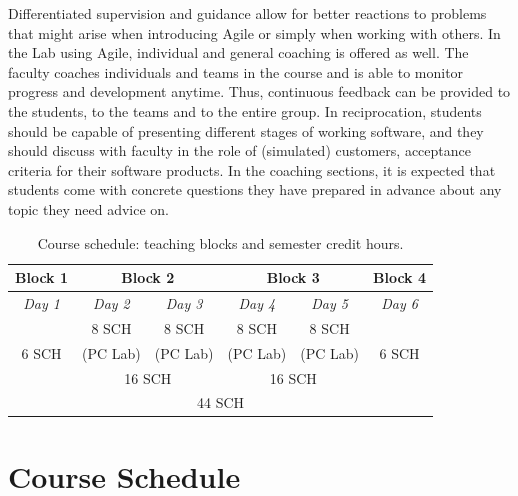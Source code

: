 \documentclass[conference]{IEEEtran}
\begin{document}
Differentiated supervision and guidance allow for better reactions to problems that might arise when introducing Agile or simply when working with others. In the Lab using Agile, individual and general coaching is offered as well. The faculty coaches individuals and teams in the course and is able to monitor progress and development anytime. Thus, continuous feedback can be provided to the students, to the teams and to the entire group. In reciprocation, students should be capable of presenting different stages of working software, and they should discuss with faculty in the role of (simulated) customers, acceptance criteria for their software products. In the coaching sections, it is expected that students come with concrete questions they have prepared in advance about any topic they need advice on.

\begin{table}[!t]
  \renewcommand{\arraystretch}{1.3}
  \setlength{\tabcolsep}{0.6em}
  \caption{Course schedule: teaching blocks and semester credit hours.}
  \label{tab:SCHblocks}
  \centering
  \begin{tabular}{|c|cc|cc|c|}
    \hline
    \bfseries Block 1 & \multicolumn{2}{|c|}{\bfseries Block 2} & \multicolumn{2}{|c|}{\bfseries Block 3} & \bfseries Block 4\\
    \hline
    \textit{Day 1} & \multicolumn{1}{|c|}{\textit{Day 2}} & \textit{Day 3} & \multicolumn{1}{|c|}{\textit{Day 4}} & \textit{Day 5} & \textit{Day 6}\\
    \hline
    \hline
    & \multicolumn{1}{|c|}{8 SCH} & \multicolumn{1}{|c|}{8 SCH} & \multicolumn{1}{|c|}{8 SCH} & \multicolumn{1}{|c|}{8 SCH} & \\
    6 SCH & \multicolumn{1}{|c|}{(PC Lab)} & \multicolumn{1}{|c|}{(PC Lab)} & \multicolumn{1}{|c|}{(PC Lab)} & \multicolumn{1}{|c|}{(PC Lab)} & 6 SCH \\
    \cline{2-4}
    \cline{4-5}
    & \multicolumn{2}{|c|}{16 SCH} & \multicolumn{2}{|c|}{16 SCH} & \\
    \hline
    \hline
    \multicolumn{6}{|c|}{44 SCH} \\
    \hline
\end{tabular}
\end{table} 




\section{Course Schedule}
\label{sec:courseschedule}
\end{document}
